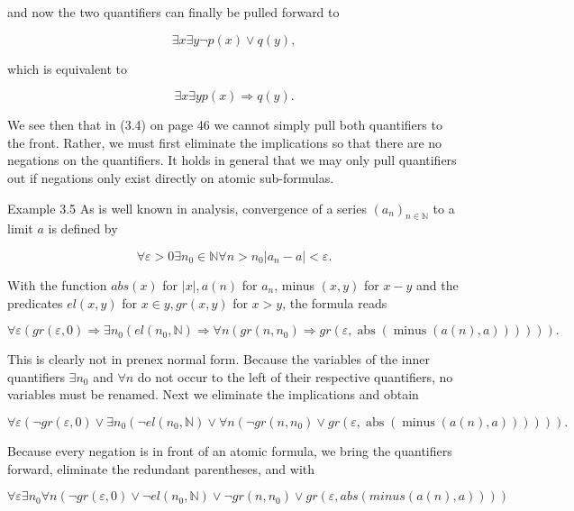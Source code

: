 \documentclass[10pt]{book}
\begin{document}
and now the two quantifiers can finally be pulled forward to

$$
\exists x \exists y \neg p(x) \vee q(y),
$$

which is equivalent to

$$
\exists x \exists y p(x) \Rightarrow q(y) .
$$

We see then that in (3.4) on page 46 we cannot simply pull both quantifiers to the front. Rather, we must first eliminate the implications so that there are no negations on the quantifiers. It holds in general that we may only pull quantifiers out if negations only exist directly on atomic sub-formulas.

Example 3.5 As is well known in analysis, convergence of a series $\left(a_{n}\right)_{n \in \mathbb{N}}$ to a limit $a$ is defined by

$$
\forall \varepsilon>0 \exists n_{0} \in \mathbb{N} \forall n>n_{0}\left|a_{n}-a\right|<\varepsilon .
$$

With the function $a b s(x)$ for $|x|, a(n)$ for $a_{n}$, minus $(x, y)$ for $x-y$ and the predicates $e l(x, y)$ for $x \in y, g r(x, y)$ for $x>y$, the formula reads


\begin{equation*}
\forall \varepsilon\left(g r(\varepsilon, 0) \Rightarrow \exists n_{0}\left(e l\left(n_{0}, \mathbb{N}\right) \Rightarrow \forall n\left(g r\left(n, n_{0}\right) \Rightarrow g r(\varepsilon, \operatorname{abs}(\operatorname{minus}(a(n), a)))\right)\right)\right) . \tag{3.5}
\end{equation*}


This is clearly not in prenex normal form. Because the variables of the inner quantifiers $\exists n_{0}$ and $\forall n$ do not occur to the left of their respective quantifiers, no variables must be renamed. Next we eliminate the implications and obtain

$$
\forall \varepsilon\left(\neg g r(\varepsilon, 0) \vee \exists n_{0}\left(\neg e l\left(n_{0}, \mathbb{N}\right) \vee \forall n\left(\neg g r\left(n, n_{0}\right) \vee g r(\varepsilon, \operatorname{abs}(\operatorname{minus}(a(n), a)))\right)\right)\right) .
$$

Because every negation is in front of an atomic formula, we bring the quantifiers forward, eliminate the redundant parentheses, and with

$$
\forall \varepsilon \exists n_{0} \forall n\left(\neg g r(\varepsilon, 0) \vee \neg e l\left(n_{0}, \mathbb{N}\right) \vee \neg g r\left(n, n_{0}\right) \vee g r(\varepsilon, a b s(m i n u s(a(n), a)))\right)
$$
\end{document}
